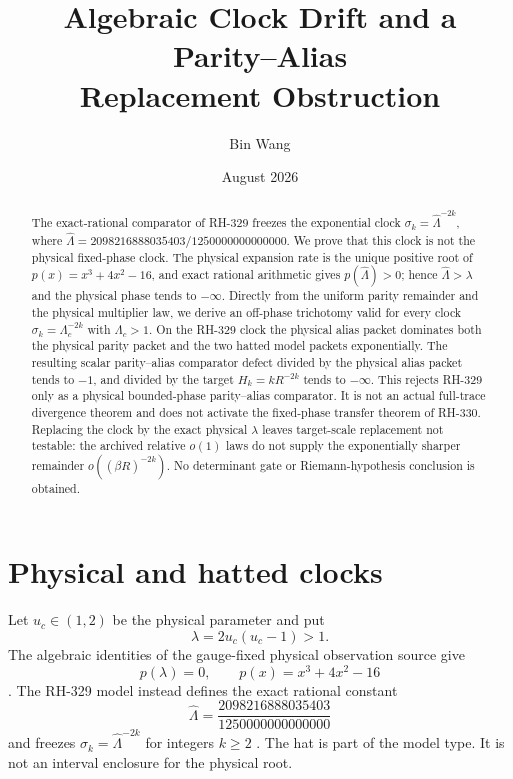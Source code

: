 \documentclass[11pt]{article}
\title{Algebraic Clock Drift and a Parity--Alias\\
Replacement Obstruction}
\author{Bin Wang}
\date{August 2026}
\theoremstyle{remark}
\newcommand{\wh}{\widehat}
\begin{document}
\maketitle

\begin{abstract}
The exact-rational comparator of RH-329 freezes the exponential clock
$\sigma_k=\widehat\Lambda^{-2k}$, where
$\widehat\Lambda=2098216888035403/1250000000000000$.  We prove that this
clock is not the physical fixed-phase clock.  The physical expansion rate is
the unique positive root of $p(x)=x^3+4x^2-16$, and exact rational arithmetic
gives $p(\widehat\Lambda)>0$; hence $\widehat\Lambda>\lambda$ and the physical
phase tends to $-\infty$.  Directly from the uniform parity remainder and the
physical multiplier law, we derive an off-phase trichotomy valid for every
clock $\sigma_k=\Lambda_c^{-2k}$ with $\Lambda_c>1$.  On the RH-329 clock the
physical alias packet dominates both the physical parity packet and the two
hatted model packets exponentially.  The resulting scalar parity--alias
comparator defect divided by the physical alias packet tends to $-1$, and
divided by the target $H_k=kR^{-2k}$ tends to $-\infty$.  This rejects RH-329
only as a physical bounded-phase parity--alias comparator.  It is not an
actual full-trace divergence theorem and does not activate the fixed-phase
transfer theorem of RH-330.  Replacing the clock by the exact physical
$\lambda$ leaves target-scale replacement not testable: the archived
relative $o(1)$ laws do not supply the exponentially sharper remainder
$o((\beta R)^{-2k})$.  No determinant gate or Riemann-hypothesis conclusion
is obtained.
\end{abstract}

\section{Physical and hatted clocks}

Let $u_c\in(1,2)$ be the physical parameter and put
\begin{equation}\label{eq:lambda-from-u}
 \lambda=2u_c(u_c-1)>1.
\end{equation}
The algebraic identities of the gauge-fixed physical observation source give
\begin{equation}\label{eq:physical-polynomial}
 p(\lambda)=0,
 \qquad p(x)=x^3+4x^2-16
\end{equation}
\citep{WangObservation2026}.  The RH-329 model instead defines the exact
rational constant
\begin{equation}\label{eq:Lambda-hat}
 \wh\Lambda=\frac{2098216888035403}{1250000000000000}
\end{equation}
and freezes $\sigma_k=\wh\Lambda^{-2k}$ for integers $k\ge2$
\citep{WangIsolatedAudit2026}.  The hat is part of the model type.  It is not
an interval enclosure for the physical root.
\end{document}
